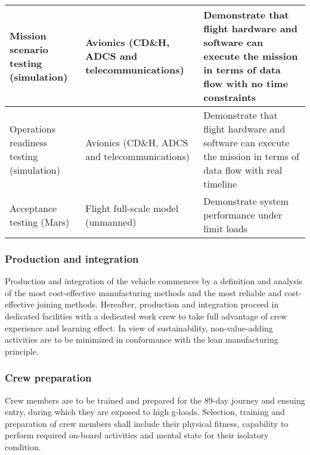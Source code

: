 \begin{table}[h]
\begin{tabular}{|p{}|p{}|p{}|}
Mission scenario testing (simulation)        & Avionics (CD\&H, ADCS and telecommunications)                                                                         & Demonstrate that flight hardware and software can execute the mission in terms of data flow with no time constraints                                                                                                              \\ \hline
Operations readiness testing (simulation)    & Avionics (CD\&H, ADCS and telecommunications)                                                                           & Demonstrate that flight hardware and software can execute the mission in terms of data flow with real timeline                                                                                                                    \\ \hline
Acceptance testing (Mars)                    & Flight full-scale model (unmanned)                                                                                      & Demonstrate system performance under limit loads                                                                                                                                                                                  \\ \hline
\end{tabular}
\end{table}

\subsubsection{Production and integration}
Production and integration of the vehicle commences by a definition and analysis of the most cost-effective manufacturing methods and the most reliable and cost-effective joining methods. Hereafter, production and integration proceed in dedicated facilities with a dedicated work crew to take full advantage of crew experience and learning effect. In view of sustainability, non-value-adding activities are to be minimized in conformance with the lean manufacturing principle. 

\subsubsection{Crew preparation}
Crew members are to be trained and prepared for the 89-day journey and ensuing entry, during which they are exposed to high g-loads. Selection, training and preparation of crew members shall include their physical fitness, capability to perform required on-board activities and mental state for their isolatory condition.

